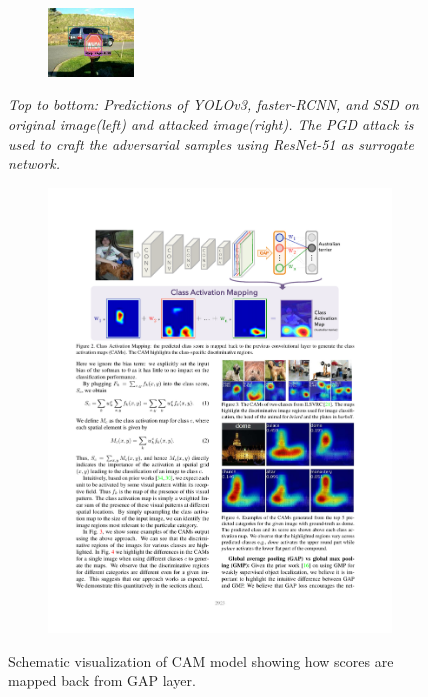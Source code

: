 \documentclass[letterpaper]{article}
\begin{document}
\begin{figure}[bhpt]
\begin{subfigure}{0.93\textwidth}
        \includegraphics[width = 0.25\textwidth, height = 0.3\textwidth]{Images/ssd_att_test3.jpg}
    \end{subfigure}
    \caption{\emph{Top to bottom: Predictions of YOLOv3, faster-RCNN, and SSD on original image(left) and attacked image(right). The PGD attack is used to craft the adversarial samples using ResNet-51 as surrogate network.}}
    \label{fig:PGD-YOLO}
\end{figure}
\begin{figure}[h]
    \centering
    \begin{subfigure}{\textwidth}
        \includegraphics{Images/CAm_pic.pdf}
    \end{subfigure}
    \caption{Schematic visualization of CAM model showing how scores are mapped back from GAP layer.\cite{zhou2015learning} }
    \label{fig:CAM}
\end{figure}
\end{document}
